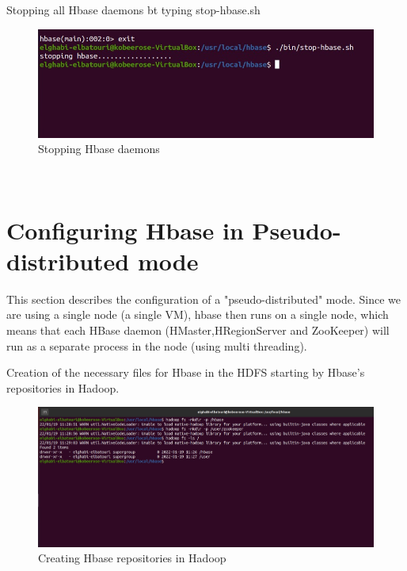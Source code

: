 \begin{spacing}{1.2}
\par Stopping all Hbase daemons bt typing stop-hbase.sh
\\
\begin{figure}[!htb] 
\begin{center} 
\includegraphics[width=1\linewidth]{Pictures/HBase/Configuring Hbase in Standalone & Pseudo-distributed mode/Configuring Hbase in Standalone mode/Stopping Hbase daemons} 
\end{center} 
\caption{Stopping Hbase daemons} 
\end{figure}  \FloatBarrier
\\

\newpage
\section{Configuring Hbase in Pseudo-distributed mode }
\par This section describes the configuration of a "pseudo-distributed" mode. Since we are using a single node (a single VM), hbase then runs on a single node, which means that each HBase daemon (HMaster,HRegionServer and ZooKeeper) will run as a separate process in the node (using multi threading).
\\

\par Creation of the necessary files for Hbase in the HDFS starting by Hbase's repositories in Hadoop.
\\
\begin{figure}[!htb] 
\begin{center} 
\includegraphics[width=1\linewidth]{Pictures/HBase/Configuring Hbase in Standalone & Pseudo-distributed mode/Configuring Hbase in Standalone mode/Creating Hbase repositories in Hadoop} 
\end{center} 
\caption{Creating Hbase repositories in Hadoop} 
\end{figure}  \FloatBarrier
\\


\end{spacing}
